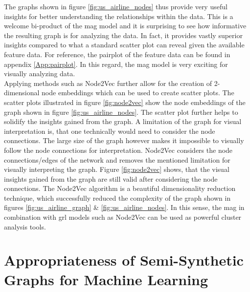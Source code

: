   \noindent The graphs shown in figure \ref{fig:us_airline_nodes} thus provide 
  very useful insights for better understanding the relationships within 
  the data. This is a welcome bi-product of the \acs{mag} model and it is surprising 
  to see how informative the resulting graph is for analyzing the data. In fact, 
  it provides vastly superior insights compared to what a standard scatter plot 
  can reveal given the available feature data. For reference, the pairplot of 
  the feature data can be found in appendix \ref{App:pairplot}. In this regard, 
  the \acs{mag} model is very exciting for visually analyzing data. \\

  \noindent Applying methods such as Node2Vec further allow for the creation
  of 2-dimensional node embeddings which can be used to create scatter plots. The
  scatter plots illustrated in figure \ref{fig:node2vec} show the node embeddings 
  of the graph shown in figure \ref{fig:us_airline_nodes}. The scatter plot further
  helps to solidify the insights gained from the graph. A limitation of the
  graph for visual interpretation is, that one technically would need to
  consider the node connections. The large size of the graph however makes it
  impossible to visually follow the node connections for interpretation. Node2Vec
  considers the node connections/edges of the network and removes the mentioned
  limitation for visually interpreting the graph. Figure \ref{fig:node2vec}
  shows, that the visual insights gained from the graph are still valid after
  considering the node connections. The Node2Vec algorithm is a beautiful
  dimensionality reduction technique, which successfully reduced the complexity
  of the graph shown in figures \ref{fig:us_airline_graph} \& 
  \ref{fig:us_airline_nodes}. In this sense, the \acs{mag} in combination 
  with \acs{grl} models such as Node2Vec can be used as powerful cluster analysis tools.
  
  \section{Appropriateness of Semi-Synthetic Graphs for Machine Learning}
  \label{section:gml_performance}

